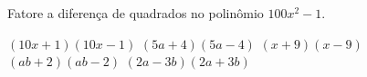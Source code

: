 Fatore a diferença de quadrados no polinômio $100x^2-1$.

$(10x+1)(10x-1)$
$(5a+4)(5a-4)$
$(x+9)(x-9)$
$(ab+2)(ab-2)$
$(2a-3b)(2a+3b)$



